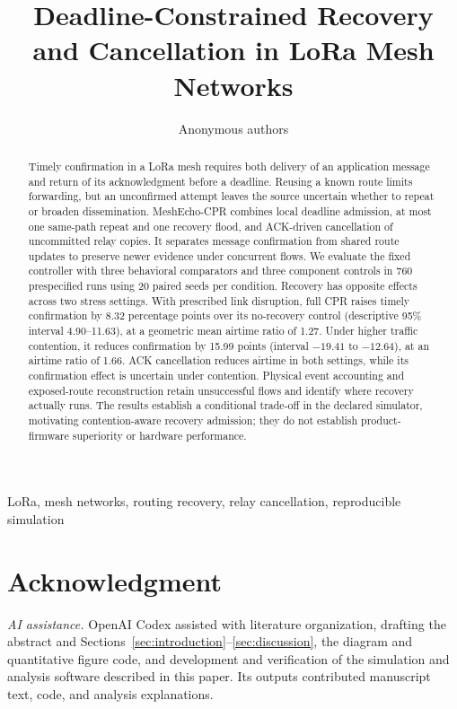 \documentclass[conference,10pt]{IEEEtran}
\title{Deadline-Constrained Recovery and Cancellation in LoRa Mesh Networks}
\author{Anonymous authors}
\begin{document}
\maketitle
\begin{abstract}
Timely confirmation in a LoRa mesh requires both delivery of an application
message and return of its acknowledgment before a deadline. Reusing a
known route limits forwarding, but an unconfirmed attempt leaves the
source uncertain whether to repeat or broaden dissemination. MeshEcho-CPR
combines local deadline admission, at most one same-path repeat and one
recovery flood, and ACK-driven cancellation of uncommitted relay copies.
It separates message confirmation from shared route updates to preserve
newer evidence under concurrent flows. We evaluate the fixed controller
with three behavioral comparators and three component controls in 760
prespecified runs using 20 paired seeds per condition. Recovery has
opposite effects across two stress settings. With prescribed link
disruption, full CPR raises timely confirmation by 8.32 percentage points
over its no-recovery control (descriptive 95\% interval 4.90--11.63), at a
geometric mean airtime ratio of 1.27. Under higher traffic contention, it
reduces confirmation by 15.99 points (interval $-19.41$ to $-12.64$), at
an airtime ratio of 1.66. ACK cancellation reduces airtime in both settings,
while its confirmation effect is uncertain under contention. Physical
event accounting and exposed-route reconstruction retain unsuccessful
flows and identify where recovery actually runs. The results establish a
conditional trade-off in the declared simulator, motivating contention-aware
recovery admission; they do not establish product-firmware superiority or
hardware performance.
\end{abstract}
\begin{IEEEkeywords}
LoRa, mesh networks, routing recovery, relay cancellation, reproducible simulation
\end{IEEEkeywords}








\section*{Acknowledgment}
\textit{AI assistance.} OpenAI Codex assisted with literature organization,
drafting the abstract and Sections~\ref{sec:introduction}--\ref{sec:discussion},
the diagram and quantitative figure code, and development and verification
of the simulation and analysis software described in this paper. Its
outputs contributed manuscript text, code, and analysis explanations.



\end{document}
